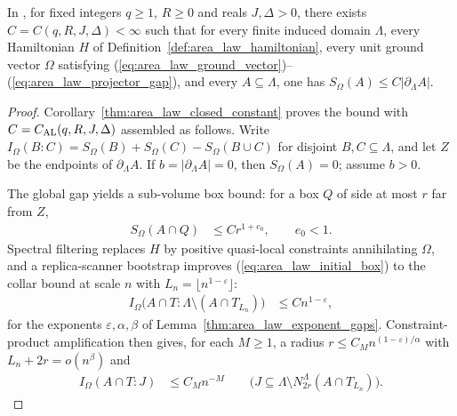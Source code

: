 \begin{theorem}
    \label{thm:openai_uniform_area_law}
    \leanok
    In \cite[Theorem~1.1]{OpenAI2026AreaLaw}, for fixed integers $q\ge1$,
    $R\ge0$ and reals $J,\Delta>0$, there exists $C=C(q,R,J,\Delta)<\infty$ such
    that for every finite induced domain $\Lambda$, every Hamiltonian $H$ of
    Definition~\ref{def:area_law_hamiltonian}, every unit ground vector $\Omega$
    satisfying (\ref{eq:area_law_ground_vector})--(\ref{eq:area_law_projector_gap}),
    and every $A\subseteq\Lambda$, one has
    $S_\Omega(A)\le C|\partial_\Lambda A|$.
\end{theorem}
\begin{proof}
    \leanok
    Corollary~\ref{thm:area_law_closed_constant} proves the bound with
    $C=C_{\rm AL}(q,R,J,\Delta)$ assembled as follows. Write
    $I_\Omega(B:C)=S_\Omega(B)+S_\Omega(C)-S_\Omega(B\cup C)$ for disjoint
    $B,C\subseteq\Lambda$, and let $Z$ be the endpoints of $\partial_\Lambda A$.
    If $b=|\partial_\Lambda A|=0$, then $S_\Omega(A)=0$; assume $b>0$.

    The global gap yields a sub-volume box bound: for a box $Q$ of side at most
    $r$ far from $Z$,
    \begin{align}
        S_\Omega(A\cap Q) & \le Cr^{1+e_0},\qquad e_0<1.
        \label{eq:area_law_initial_box}
    \end{align}
    Spectral filtering replaces $H$ by positive quasi-local constraints
    annihilating $\Omega$, and a replica-scanner bootstrap improves
    (\ref{eq:area_law_initial_box}) to the collar bound at scale $n$ with
    $L_n=\lfloor n^{1-\varepsilon}\rfloor$:
    \begin{align}
        I_\Omega\bigl(A\cap T:\Lambda\setminus(A\cap T_{L_n})\bigr)
         & \le Cn^{1-\varepsilon},
        \label{eq:area_law_collar_information}
    \end{align}
    for the exponents $\varepsilon,\alpha,\beta$ of
    Lemma~\ref{thm:area_law_exponent_gaps}. Constraint-product amplification
    then gives, for each $M\ge1$, a radius $r\le C_Mn^{(1-\varepsilon)/\alpha}$
    with $L_n+2r=o(n^\beta)$ and
    \begin{align}
        I_\Omega(A\cap T:J)
         & \le C_Mn^{-M}
        \qquad\bigl(J\subseteq\Lambda\setminus N_{2r}^\Lambda(A\cap T_{L_n})\bigr).
        \label{eq:area_law_amplified_information}
    \end{align}


\end{proof}
